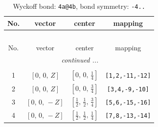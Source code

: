 \documentclass[fleqn,8pt]{jsarticle}
\begin{document}
\begin{longtable}{cccc}
\caption{Wyckoff bond: {\tt 4a@4b}, bond symmetry: {\tt -4..}}
 \\
 \hline \hline
No. & vector & center & mapping \\ \hline \endfirsthead

\multicolumn{3}{l}{\tablename\ \thetable{}} \\
 \hline \hline
No. & vector & center & mapping \\ \hline \endhead

 \hline \hline
\multicolumn{3}{r}{\footnotesize\it continued ...} \\ \endfoot

 \hline \hline
\multicolumn{3}{r}{} \\ \endlastfoot

1 & $\left[ 0,\, 0,\, Z \right]$ & $\left[ 0,\, 0,\, \frac{1}{4} \right]$ & {\tt [1,2,-11,-12]} \\ \hline
2 & $\left[ 0,\, 0,\, Z \right]$ & $\left[ 0,\, 0,\, \frac{3}{4} \right]$ & {\tt [3,4,-9,-10]} \\ \hline
3 & $\left[ 0,\, 0,\, - Z \right]$ & $\left[ \frac{1}{2},\, \frac{1}{2},\, \frac{3}{4} \right]$ & {\tt [5,6,-15,-16]} \\ \hline
4 & $\left[ 0,\, 0,\, - Z \right]$ & $\left[ \frac{1}{2},\, \frac{1}{2},\, \frac{1}{4} \right]$ & {\tt [7,8,-13,-14]} \\
\end{longtable}
\renewcommand{\arraystretch}{1.2}
\end{document}
